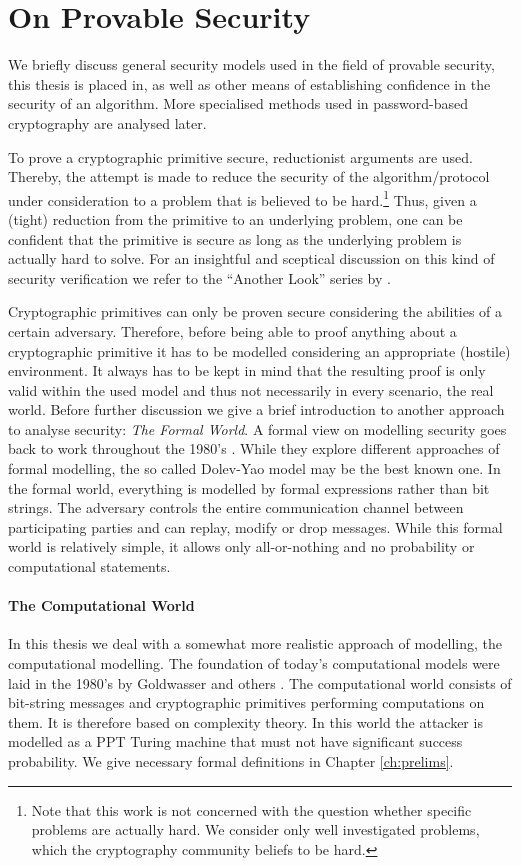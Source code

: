 \section{On Provable Security}\label{sec:intro:provable-security}
We briefly discuss general security models used in the field of provable security, this thesis is placed in, as well as other means of establishing confidence in the security of an algorithm.
More specialised methods used in password-based cryptography are analysed later.

To prove a cryptographic primitive secure, reductionist arguments are used.
Thereby, the attempt is made to reduce the security of the algorithm/protocol under consideration to a problem that is believed to be hard.\footnote{Note that this work is not concerned with the question whether specific problems are actually hard. We consider only well investigated problems, which the cryptography community beliefs to be hard.}
Thus, given a (tight) reduction from the primitive to an underlying problem, one can be confident that the primitive is secure as long as the underlying problem is actually hard to solve.
For an insightful and sceptical discussion on this kind of security verification we refer to the ``Another Look'' series by \citet{AnotherLook}.

Cryptographic primitives can only be proven secure considering the abilities of a certain adversary.
Therefore, before being able to proof anything about a cryptographic primitive it has to be modelled considering an appropriate (hostile) environment.
It always has to be kept in mind that the resulting proof is only valid within the used model and thus not necessarily in every scenario, \ie the real world.
Before further discussion we give a brief introduction to another approach to analyse security: \emph{The Formal World}.
A formal view on modelling security goes back to work throughout the 1980's \cite{DeMillo82,Dolev83,Millen87,Meadows91,Kemmerer1988,Burrows90}.
While they explore different approaches of formal modelling, the so called Dolev-Yao model \cite{Dolev83} may be the best known one.
In the formal world, everything is modelled by formal expressions rather than bit strings.
The adversary controls the entire communication channel between participating parties and can replay, modify or drop messages.
While this formal world is relatively simple, it allows only all-or-nothing  and no probability or computational statements.

\paragraph{The Computational World}
In this thesis we deal with a somewhat more realistic approach of modelling, the computational modelling.
The foundation of today's computational models were laid in the 1980's by Goldwasser and others \cite{Goldwasser82,Goldwasser84,Yao82,Blum82}.
The computational world consists of bit-string messages and cryptographic primitives performing computations on them.
It is therefore based on complexity theory.
In this world the attacker is modelled as a \ac{PPT} Turing machine \cite{Turing37} that must not have significant success probability.
We give necessary formal definitions in Chapter \ref{ch:prelims}.

